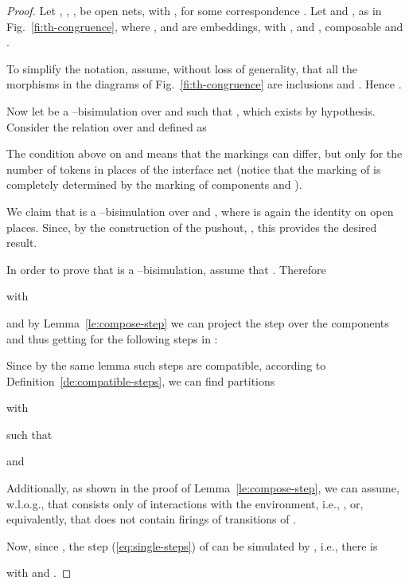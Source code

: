 \documentclass{LMCS}
\begin{document}
\begin{proof}
  Let , , ,  be open nets, with , for some correspondence .
Let   and , as in
  Fig.~\ref{fi:th-congruence}, where ,  and  are
  embeddings, with ,  and  , 
  composable and .

  To simplify the notation, assume, without loss of generality, that
  all the morphisms in the diagrams of Fig.~\ref{fi:th-congruence} are
  inclusions and .  Hence .

  Now let  be a --bisimulation over  and
   such that , which exists by
  hypothesis.  Consider the relation  over  and
   defined as

 \begin{center}
   
  \end{center}
The condition above on  and  means that the markings can
  differ, but only for the number of tokens in places of the interface
  net  (notice that the marking of  is completely determined
  by the marking of components  and ).

  We claim that  is a --bisimulation
  over  and , where  is again the identity on open
  places.  Since, by the construction of the pushout, , this provides the
  desired result.

  \medskip

  In order to prove that  is a
  --bisimulation, assume that .
Therefore
  \begin{center}
     \quad with 
  \end{center}
  and by Lemma~\ref{le:compose-step} we can project the step  over
  the components  and  thus getting for 
  the following steps in :
  
  Since by the same lemma such steps are compatible, according to
  Definition~\ref{de:compatible-steps}, we can find partitions
  \begin{center}
     with  
  \end{center}
  such that
  
  and 
  
  Additionally, as shown in the proof of Lemma~\ref{le:compose-step},
  we can assume, w.l.o.g., that  consists only of interactions
  with the environment, i.e., , or, equivalently, that  does not
  contain firings of transitions of .

  \medskip

  Now, since , the step
  (\ref{eq:single-steps}) of  can be simulated by , i.e.,
  there is
  
  with  and .


\end{proof}
\end{document}

